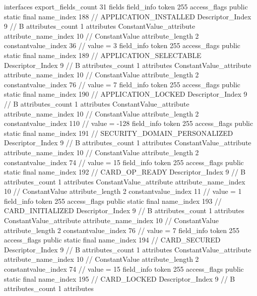 {{{			interfaces {
			}
			export_fields_count	31
			fields {
			field_info {
				token	255
				access_flags	public static final
				name_index	188		// APPLICATION_INSTALLED
				Descriptor_Index	9		// B
				attributes_count	1
				attributes {
				ConstantValue_attribute {
					attribute_name_index	10		// ConstantValue
					attribute_length	2
					constantvalue_index	36		// value = 3
				}
				}
			}
			field_info {
				token	255
				access_flags	public static final
				name_index	189		// APPLICATION_SELECTABLE
				Descriptor_Index	9		// B
				attributes_count	1
				attributes {
				ConstantValue_attribute {
					attribute_name_index	10		// ConstantValue
					attribute_length	2
					constantvalue_index	76		// value = 7
				}
				}
			}
			field_info {
				token	255
				access_flags	public static final
				name_index	190		// APPLICATION_LOCKED
				Descriptor_Index	9		// B
				attributes_count	1
				attributes {
				ConstantValue_attribute {
					attribute_name_index	10		// ConstantValue
					attribute_length	2
					constantvalue_index	110		// value = -128
				}
				}
			}
			field_info {
				token	255
				access_flags	public static final
				name_index	191		// SECURITY_DOMAIN_PERSONALIZED
				Descriptor_Index	9		// B
				attributes_count	1
				attributes {
				ConstantValue_attribute {
					attribute_name_index	10		// ConstantValue
					attribute_length	2
					constantvalue_index	74		// value = 15
				}
				}
			}
			field_info {
				token	255
				access_flags	public static final
				name_index	192		// CARD_OP_READY
				Descriptor_Index	9		// B
				attributes_count	1
				attributes {
				ConstantValue_attribute {
					attribute_name_index	10		// ConstantValue
					attribute_length	2
					constantvalue_index	11		// value = 1
				}
				}
			}
			field_info {
				token	255
				access_flags	public static final
				name_index	193		// CARD_INITIALIZED
				Descriptor_Index	9		// B
				attributes_count	1
				attributes {
				ConstantValue_attribute {
					attribute_name_index	10		// ConstantValue
					attribute_length	2
					constantvalue_index	76		// value = 7
				}
				}
			}
			field_info {
				token	255
				access_flags	public static final
				name_index	194		// CARD_SECURED
				Descriptor_Index	9		// B
				attributes_count	1
				attributes {
				ConstantValue_attribute {
					attribute_name_index	10		// ConstantValue
					attribute_length	2
					constantvalue_index	74		// value = 15
				}
				}
			}
			field_info {
				token	255
				access_flags	public static final
				name_index	195		// CARD_LOCKED
				Descriptor_Index	9		// B
				attributes_count	1
				attributes {
}}}}}}
